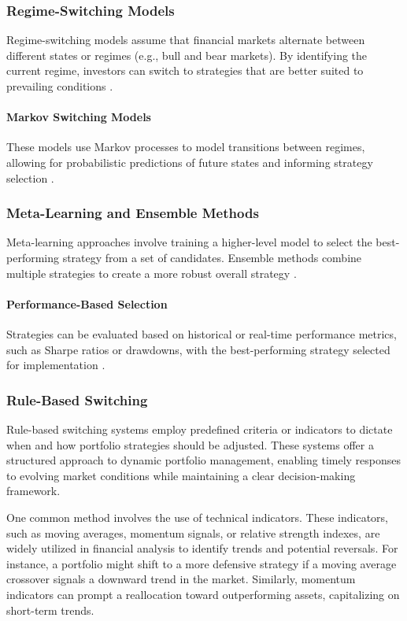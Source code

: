 \subsubsection{Regime-Switching Models}

Regime-switching models assume that financial markets alternate between different states or regimes (e.g., bull and bear markets). By identifying the current regime, investors can switch to strategies that are better suited to prevailing conditions \cite{ang2002regime}.

\paragraph{Markov Switching Models}

These models use Markov processes to model transitions between regimes, allowing for probabilistic predictions of future states and informing strategy selection \cite{hamilton1989new}.

\subsubsection{Meta-Learning and Ensemble Methods}

Meta-learning approaches involve training a higher-level model to select the best-performing strategy from a set of candidates. Ensemble methods combine multiple strategies to create a more robust overall strategy \cite{huang2019building}.

\paragraph{Performance-Based Selection}

Strategies can be evaluated based on historical or real-time performance metrics, such as Sharpe ratios or drawdowns, with the best-performing strategy selected for implementation \cite{poterba2000portfolio}.

\subsubsection{Rule-Based Switching}
Rule-based switching systems employ predefined criteria or indicators to dictate when and how portfolio strategies should be adjusted. These systems offer a structured approach to dynamic portfolio management, enabling timely responses to evolving market conditions while maintaining a clear decision-making framework.

One common method involves the use of technical indicators. These indicators, such as moving averages, momentum signals, or relative strength indexes, are widely utilized in financial analysis to identify trends and potential reversals. For instance, a portfolio might shift to a more defensive strategy if a moving average crossover signals a downward trend in the market. Similarly, momentum indicators can prompt a reallocation toward outperforming assets, capitalizing on short-term trends.

